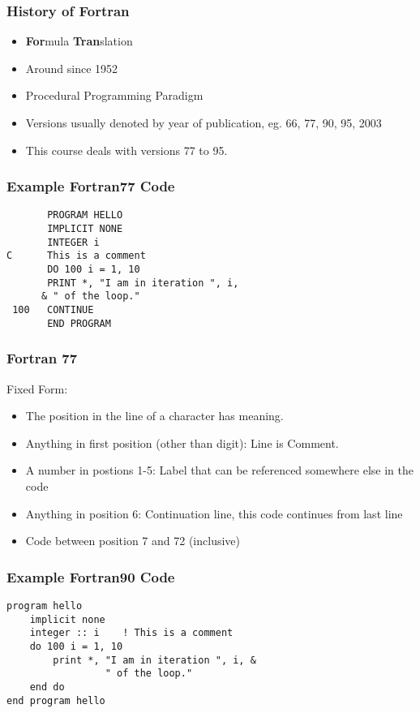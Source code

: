 \begin{frame}
  \frametitle{History of Fortran}
  \begin{itemize}
    \item \textbf{For}mula \textbf{Tran}slation
    \item Around since 1952
    \item Procedural Programming Paradigm
    \item Versions usually denoted by year of publication, eg. 66, 77, 90, 95, 2003
    \item This course deals with versions 77 to 95.
  \end{itemize}
\end{frame}

\begin{frame}[fragile]
  \frametitle{Example Fortran77 Code}
  \begin{lstlisting}
       PROGRAM HELLO
       IMPLICIT NONE
       INTEGER i
C      This is a comment
       DO 100 i = 1, 10
       PRINT *, "I am in iteration ", i,
      & " of the loop."
 100   CONTINUE
       END PROGRAM
  \end{lstlisting}
\end{frame}

\begin{frame}
  \frametitle{Fortran 77}
  Fixed Form:
  \begin{itemize}
       \item The position in the line of a character has meaning.
       \item Anything in first position (other than digit): 
             Line is Comment.
       \item A number in postions 1-5: 
             Label that can be referenced somewhere else in the code
       \item Anything in position 6:
             Continuation line, this code continues from last line
       \item Code between position 7 and 72 (inclusive)
  \end{itemize}
\end{frame}

\begin{frame}[fragile]
  \frametitle{Example Fortran90 Code}
  \begin{lstlisting}
program hello
    implicit none
    integer :: i    ! This is a comment
    do 100 i = 1, 10
        print *, "I am in iteration ", i, & 
                 " of the loop."
    end do
end program hello
  \end{lstlisting}
\end{frame}

